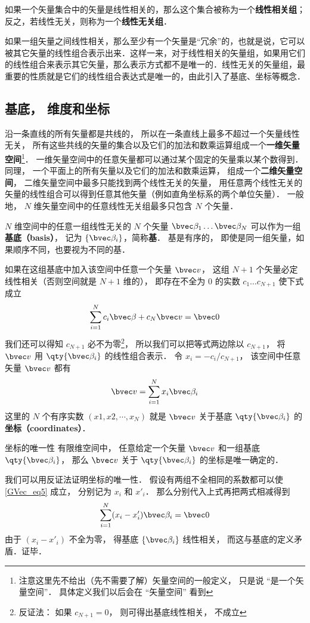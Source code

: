 如果一个矢量集合中的矢量是线性相关的，那么这个集合被称为一个\textbf{线性相关组}；反之，若线性无关，则称为一个\textbf{线性无关组}．

如果一组矢量之间线性相关，那么至少有一个矢量是“冗余”的，也就是说，它可以被其它矢量的线性组合表示出来．这样一来，对于线性相关的矢量组，如果用它们的线性组合来表示其它矢量，那么表示方式都不是唯一的．线性无关的矢量组，最重要的性质就是它们的线性组合表达式是唯一的，由此引入了基底、坐标等概念．

\subsection{基底， 维度和坐标}
沿一条直线的所有矢量都是共线的， 所以在一条直线上最多不超过一个矢量线性无关， 所有这些共线的矢量的集合以及它们的加法和数乘运算组成一个\textbf{一维矢量空间}\footnote{注意这里先不给出（先不需要了解）矢量空间的一般定义， 只是说 “是一个矢量空间”． 具体定义我们以后会在 “矢量空间” 看到}． 一维矢量空间中的任意矢量都可以通过某个固定的矢量乘以某个数得到． 同理， 一个平面上的所有矢量以及它们的加法和数乘运算， 组成一个\textbf{二维矢量空间}， 二维矢量空间中最多只能找到两个线性无关的矢量， 用任意两个线性无关的矢量的线性组合可以得到任意其他矢量（例如直角坐标系的两个单位矢量）． 一般地， $N$ 维矢量空间中的任意线性无关组最多只包含 $N$ 个矢量．

$N$ 维空间中的任意一组线性无关的 $N$ 个矢量 $\bvec \beta_1\dots \bvec \beta_N$ 可以作为一组\textbf{基底（basis）}， 记为 $\{\bvec \beta_i\}$，简称\textbf{基}． 基是有序的， 即使是同一组矢量，如果顺序不同，也要视为不同的基．

如果在这组基底中加入该空间中任意一个矢量 $\bvec v$， 这组 $N+1$ 个矢量必定线性相关（否则空间就是 $N+1$ 维的）， 即存在不全为 0 的实数 $c_1\dots c_{N+1}$ 使下式成立
\begin{equation}
\sum_{i=1}^{N} c_i \bvec \beta + c_N \bvec v = \bvec 0
\end{equation}
我们还可以得知 $c_{N+1}$ 必不为零\footnote{反证法： 如果 $c_{N+1} = 0$， 则可得出基底线性相关， 不成立}， 所以我们可以把等式两边除以 $c_{N+1}$， 将 $\bvec v$ 用 $\qty{\bvec \beta_i}$ 的线性组合表示． 令 $x_i = -c_i/c_{N+1}$， 该空间中任意矢量 $\bvec v$ 都有
\begin{equation}\label{GVec_eq5}
\bvec v = \sum_{i=1}^N x_i \bvec \beta_i
\end{equation}
这里的 $N$ 个有序实数 $(x1, x2, \cdots, x_N)$ 就是 $\bvec v$ 关于基底 $\qty{\bvec \beta_i}$ 的\textbf{坐标（coordinates）}．

\begin{theorem}{坐标的唯一性}
有限维空间中， 任意给定一个矢量 $\bvec v$ 和一组基底 $\qty{\bvec \beta_i}$， 那么 $\bvec v$ 关于 $\qty{\bvec \beta_i}$ 的坐标是唯一确定的．
\end{theorem}
我们可以用反证法证明坐标的唯一性． 假设有两组不全相同的系数都可以使\autoref{GVec_eq5} 成立， 分别记为 $x_i$ 和 $x'_i$． 那么分别代入上式再把两式相减得到
\begin{equation}
\sum_{i=1}^N (x_i-x'_i) \bvec \beta_i = \bvec 0
\end{equation}
由于 $(x_i-x'_i)$ 不全为零， 得基底 $\{\bvec \beta_i\}$ 线性相关， 而这与基底的定义矛盾．证毕．

